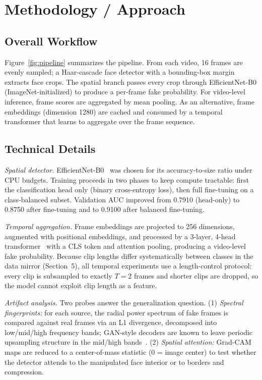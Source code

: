 \documentclass[conference]{IEEEtran}
\begin{document}
\section{Methodology / Approach}
\subsection{Overall Workflow}
Figure~\ref{fig:pipeline} summarizes the pipeline. From each video, 16 frames are evenly sampled; a Haar-cascade face detector with a bounding-box margin extracts face crops. The spatial branch passes every crop through EfficientNet-B0 (ImageNet-initialized) to produce a per-frame fake probability. For video-level inference, frame scores are aggregated by mean pooling. As an alternative, frame embeddings (dimension 1280) are cached and consumed by a temporal transformer that learns to aggregate over the frame sequence.

\subsection{Technical Details}
\emph{Spatial detector.} EfficientNet-B0~\cite{tan2019efficientnet} was chosen for its accuracy-to-size ratio under CPU budgets. Training proceeds in two phases to keep compute tractable: first the classification head only (binary cross-entropy loss), then full fine-tuning on a class-balanced subset. Validation AUC improved from 0.7910 (head-only) to 0.8750 after fine-tuning and to 0.9100 after balanced fine-tuning.

\emph{Temporal aggregation.} Frame embeddings are projected to 256 dimensions, augmented with positional embeddings, and processed by a 3-layer, 4-head transformer~\cite{vaswani2017attention} with a CLS token and attention pooling, producing a video-level fake probability. Because clip lengths differ systematically between classes in the data mirror (Section~5), all temporal experiments use a length-control protocol: every clip is subsampled to exactly $T=2$ frames and shorter clips are dropped, so the model cannot exploit clip length as a feature.

\emph{Artifact analysis.} Two probes answer the generalization question. (1) \emph{Spectral fingerprints:} for each source, the radial power spectrum of fake frames is compared against real frames via an L1 divergence, decomposed into low/mid/high frequency bands; GAN-style decoders are known to leave periodic upsampling structure in the mid/high bands~\cite{durall2020fourier,wang2020cnngen}. (2) \emph{Spatial attention:} Grad-CAM~\cite{selvaraju2020gradcam} maps are reduced to a center-of-mass statistic (0 = image center) to test whether the detector attends to the manipulated face interior or to borders and compression.
\end{document}
